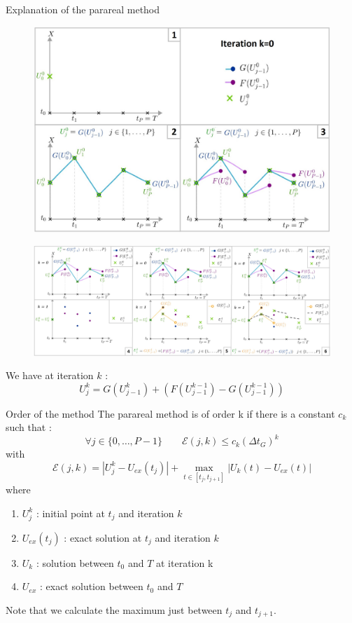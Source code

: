 \begin{frame}[allowframebreaks]{Explanation of the parareal method}
	\begin{figure}
		\centering
		\includegraphics[width=0.6\linewidth]{images/parareal/parareal_k0.jpg}
	\end{figure}
	\begin{figure}
		\centering
		\includegraphics[width=\linewidth]{images/parareal/parareal_k1.jpg}
	\end{figure}
	\small
	We have at iteration $k$ :
	$$U_j^k=G(U_{j-1}^k)+(F(U_{j-1}^{k-1})-G(U_{j-1}^{k-1}))$$
\end{frame}

\begin{frame}{Order of the method}
	The parareal method is of order k if there is a constant $c_k$ such that :
	\begin{equation*}
		\forall j\in\{0,\dots,P-1\} \qquad \mathcal{E}(j,k)\le c_k(\Delta t_G)^k
	\end{equation*}
	with
	$$\mathcal{E}(j,k)=|U_j^k-U_{ex}(t_j)|+\max_{t\in[t_j,t_{j+1}]}|U_k(t)-U_{ex}(t)|$$
	where 
	\begin{enumerate}[\textbullet]
		\item $U_j^k$ : initial point at $t_j$ and iteration $k$
		\item $U_{ex}(t_j)$ : exact solution at $t_j$ and iteration $k$
		\item $U_k$ : solution between $t_0$ and $T$ at iteration k
		\item $U_{ex}$ : exact solution between $t_0$ and $T$
	\end{enumerate}
	Note that we calculate the maximum just between $t_j$ and $t_{j+1}$.
\end{frame}

